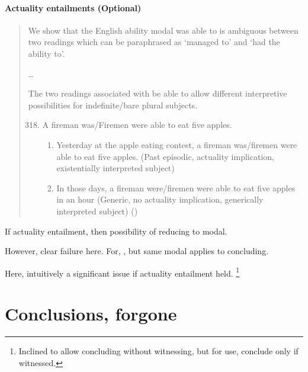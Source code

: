 \paragraph[Actuality entailments]{Actuality entailments \hfill (Optional)}


\begin{note}
  \begin{quote}
    We show that the English ability modal was able to is ambiguous between two readings which can be paraphrased as `managed to' and `had the ability to'.

    \dots

    The two readings associated with be able to allow different interpretive possibilities for indefinite/bare plural subjects.

    \begin{enumerate}[label=(\arabic*), ref=(\arabic*)]
      \setcounter{enumi}{317}
    \item
      A fireman was/Firemen were able to eat five apples.
      \begin{enumerate}[label=\alph*., ref=\alph*.]
      \item
        Yesterday at the apple eating contest, a fireman was/firemen were able to eat five apples.
        (Past episodic, actuality implication, existentially interpreted subject)
      \item
        In those days, a fireman were/firemen were able to eat five apples in an hour (Generic, no actuality implication, generically interpreted subject)%
        \mbox{}\hfill\mbox{(\citeauthor[172--173]{Bhatt:1999wq})}
      \end{enumerate}
    \end{enumerate}
  \end{quote}

  If actuality entailment, then possibility of reducing to modal.

  However, clear failure here.
  For, \support{}, but same modal applies to concluding.

  Here, intuitively a significant issue if actuality entailment held.%
  \footnote{
    Inclined to allow concluding without witnessing, but for use, conclude only if witnessed.
  }
\end{note}


\newpage

\section{Conclusions, forgone}
\label{sec:fc3-1}


